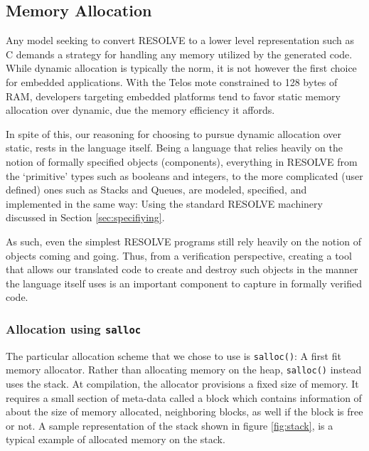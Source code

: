

\subsection{Memory Allocation}

Any model seeking to convert RESOLVE to a lower level representation such as C demands a strategy for handling any memory utilized by the generated code. While dynamic allocation is typically the norm, it is not however the first choice for embedded applications. With the Telos mote constrained to 128 bytes of RAM, developers targeting embedded platforms tend to favor static memory allocation over dynamic, due the memory efficiency it affords. 


In spite of this, our reasoning for choosing to pursue dynamic allocation over static, rests in the language itself. Being a language that relies heavily on the notion of formally specified objects (components), everything in RESOLVE from the `primitive' types such as booleans and integers, to the more complicated (user defined) ones such as Stacks and Queues, are modeled, specified, and implemented in the same way: Using the standard RESOLVE machinery discussed in Section \ref{sec:specifiying}. 

As such, even the simplest RESOLVE programs still rely heavily on the notion of objects coming and going. Thus, from a verification perspective, creating a tool that allows our translated code to create and destroy such objects in the manner the language itself uses is an important component to capture in formally verified code.

\subsubsection{Allocation using \texttt{salloc}}

The particular allocation scheme that we chose to use is \texttt{salloc()}: A first fit memory allocator. Rather than allocating memory on the heap, \texttt{salloc()} instead uses the stack. At compilation, the allocator provisions a fixed size of memory. It requires a small section of meta-data called a block which contains information of about the size of memory allocated, neighboring blocks, as well if the block is free or not. A sample representation of the stack shown in figure \ref{fig:stack}, is a typical example of allocated memory on the stack.

